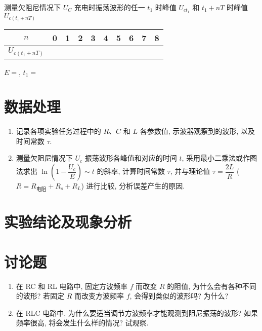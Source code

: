 \documentclass[signature=data]{physicsreport}
\begin{document}

测量欠阻尼情况下 $U_C$ 充电时振荡波形的任一 $t_1$ 时峰值 $U_{ct_1}$ 和 $t_1+nT$ 时峰值 $U_{c(t_1+nT)}$

\vspace*{.5em}
{\centering
    \begin{tabularx}{\textwidth}{|c|Y|Y|Y|Y|Y|Y|Y|Y|Y|} \hline
        $n$             & 0 & 1 & 2 & 3 & 4 & 5 & 6 & 7 & 8 \\\hline
        $U_{c(t_1+nT)}$ &   &   &   &   &   &   &   &   &   \\\hline
    \end{tabularx}
    \par}
\vspace*{.5em}

$E=$\hspace*{4em}, $t_1=$





\makeatletter
{}
\makeatother

\newpage
\section{数据处理}
\begin{enumerate}
    \item 记录各项实验任务过程中的 $R$、$C$ 和 $L$ 各参数值, 示波器观察到的波形, 以及时间常数 $\tau$.
    \item 测量欠阻尼情况下 $U_c$ 振荡波形各峰值和对应的时间 $t$, 采用最小二乘法或作图法求出 $\ln\left(1-\dfrac{U_c}{E}\right)\sim t$ 的斜率, 计算时间常数 $\tau$, 并与理论值 $\tau=\dfrac{2L}{R}$ ($R=R_{电阻}+R_s+R_L$) 进行比较, 分析误差产生的原因.
\end{enumerate}

\newpage
\section{实验结论及现象分析}

\vspace*{6cm}
\section{讨论题}
\begin{enumerate}
    \item 在 RC 和 RL 电路中, 固定方波频率 $f$ 而改变 $R$ 的阻值, 为什么会有各种不同的波形? 若固定 $R$ 而改变方波频率 $f$, 会得到类似的波形吗? 为什么?
    \item 在 RLC 电路中, 为什么要适当调节方波频率才能观测到阻尼振荡的波形? 如果频率很高, 将会发生什么样的情况? 试观察.
\end{enumerate}
\end{document}

